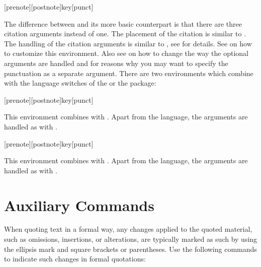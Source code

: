 \documentclass{ltxdockit}[2010/09/26]
\begin{document}
\begin{ltxsyntax}

[prenote][postnote]{key}[punct]

The difference between  and its more basic counterpart is that there are three citation arguments instead of one. The placement of the citation is similar to . The handling of the citation arguments is similar to , see  for details. See  on how to customize this environment. Also see  on how to change the way the optional arguments are handled and  for reasons why you may want to specify the punctuation as a separate argument. There are two environments which combine  with the language switches of the  or the  package:

[prenote][postnote]{key}[punct]

This environment combines  with . Apart from the language, the arguments are handled as with .

[prenote][postnote]{key}[punct]

This environment combines  with . Apart from the language, the arguments are handled as with .

\end{ltxsyntax}

\section{Auxiliary Commands}
\label{aux}

When quoting text in a formal way, any changes applied to the quoted material, such as omissions, insertions, or alterations, are typically marked as such by using the ellipsis mark and square brackets or parentheses. Use the following commands to indicate such changes in formal quotations:
\end{document}
